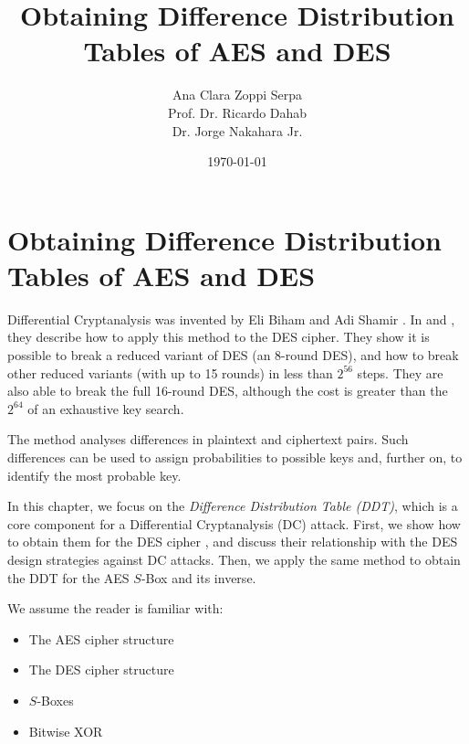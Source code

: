 \documentclass{report}
\title{Obtaining Difference Distribution Tables of AES and DES}
\author{Ana Clara Zoppi Serpa\\ Prof. Dr. Ricardo Dahab \\ Dr. Jorge Nakahara Jr.}
\date{\today}
\begin{document}
\maketitle

\tableofcontents

\chapter{Obtaining Difference Distribution Tables of AES and DES}

Differential Cryptanalysis was invented by Eli Biham and Adi Shamir \cite{Shamir}. In \cite{Shamir} and \cite{ShamirBook}, they describe how to apply this method to the DES cipher. They show it is possible to break a reduced variant of DES (an 8-round DES), and how to break other reduced variants (with up to 15 rounds) in less than $2^{56}$ steps. They are also able to break the full 16-round DES, although the cost is greater than the $2^{64}$ of an exhaustive key search.

The method analyses differences in plaintext and ciphertext pairs. Such differences can be used to assign probabilities to possible keys and, further on, to identify the most probable key.

In this chapter, we focus on the \emph{Difference Distribution Table (DDT)}, which is a core component for a Differential Cryptanalysis (DC) attack. First, we show how to obtain them for the DES cipher \cite{DES-FIPS}, and discuss their relationship with the DES design strategies \cite{Coppersmith1994} against DC attacks. Then, we apply the same method to obtain the DDT for the AES $S$-Box and its inverse.

We assume the reader is familiar with:
\begin{itemize}
    \item The AES cipher structure
    \item The DES cipher structure
    \item $S$-Boxes
    \item Bitwise XOR
\end{itemize}
\end{document}
